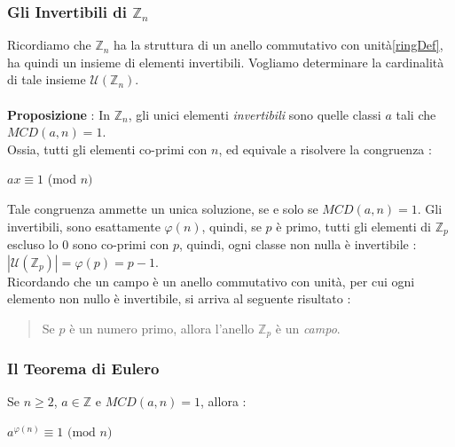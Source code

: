\documentclass[12pt, letterpaper]{article}
\begin{document}
\subsubsection{Gli Invertibili di \(\mathbb{Z}_n\)}
Ricordiamo che \(\mathbb{Z}_n\) ha la struttura di un anello commutativo con unità\ref{ringDef}, ha quindi un insieme di 
elementi invertibili. Vogliamo determinare la cardinalità di tale insieme \(\mathcal{U}(\mathbb{Z}_n)\).
\\\hphantom{.}\\\textbf{Proposizione }: In \(\mathbb{Z}_n\), gli unici elementi \textit{invertibili} sono 
quelle classi \(a\) tali che \(MCD(a,n)=1\). \\
Ossia, tutti gli elementi co-primi con \(n\), ed equivale a risolvere la congruenza :\begin{center}
    \(ax\equiv 1 \) (mod \(n)\)
\end{center} Tale congruenza ammette un unica soluzione, se e solo se \(MCD(a,n)=1\). Gli 
invertibili, sono esattamente 
\(\varphi(n)\), quindi, se \(p\) è primo, tutti gli elementi di \(\mathbb{Z}_p\) escluso lo 0 sono co-primi con \(p\), quindi,
ogni classe non nulla è invertibile : \(|\mathcal{U}(\mathbb{Z}_p)|=\varphi(p)=p-1\). \\ 
Ricordando che un campo è un anello commutativo con unità, per cui ogni elemento non nullo è invertibile, 
si arriva al seguente risultato :\begin{quote}
    \begin{center}
        Se \(p\) è un numero primo, allora l'anello \(\mathbb{Z}_p\) è un \textit{campo}.
    \end{center}
\end{quote}
\subsubsection{Il Teorema di Eulero}
Se \(n\ge 2\), \(a\in \mathbb{Z}\) e \(MCD(a,n)=1\), allora :\begin{center}
    \(a^{\varphi(n)}\equiv 1 \text{ (mod }n\text{)}\)
\end{center}
\end{document}
